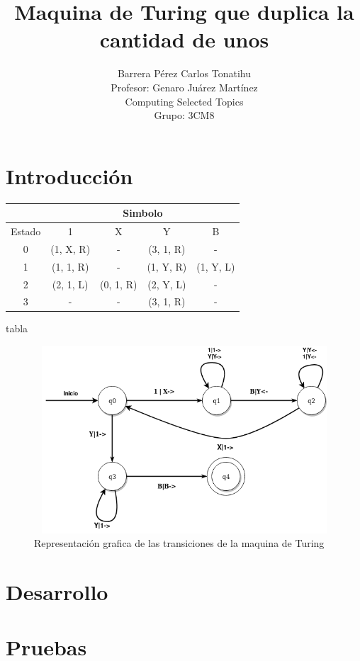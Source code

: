 \documentclass[a4paper,12pt]{article}
\title{Maquina de Turing que duplica la cantidad de unos}
\author{Barrera Pérez Carlos Tonatihu \\ Profesor: Genaro Juárez Martínez \\ Computing Selected Topics \\ Grupo: 3CM8 }
\begin{document}
\maketitle
\newpage
\tableofcontents
\newpage
\section{Introducción}
\begin{center}
\begin{tabular}{|c|c|c|c|c|}
\hline
& \multicolumn{4}{|c|}{Simbolo} \\ \hline
Estado & 1 & X & Y & B\\ \hline
0 & (1, X, R) & - & (3, 1, R) & -\\ \hline
1 & (1, 1, R) & - & (1, Y, R) & (1, Y, L)\\ \hline
2 & (2, 1, L) & (0, 1, R) & (2, Y, L) & -\\ \hline
3 & - & - & (3, 1, R) & - \\ \hline
\end{tabular}
\end{center}
tabla
\begin{figure}[H]
\begin{center}
 \includegraphics[width=12cm, height=7cm]{Turing-unos.png}
 \caption{Representación grafica de las transiciones de la maquina de Turing}
 \label{fig:diagrama4}
\end{center}
\end{figure}
\section{Desarrollo}
\section{Pruebas}
\end{document}
